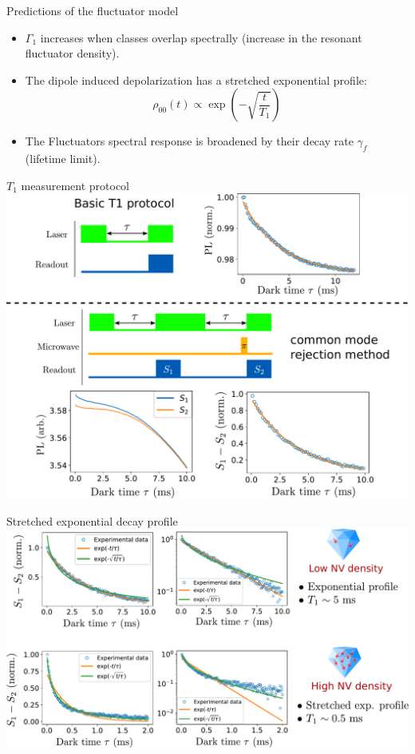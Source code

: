 \documentclass{beamer}
\begin{document}
\begin{frame}{Predictions of the fluctuator model}
\begin{itemize}
\item $\Gamma_1$ increases when classes overlap spectrally (increase in the resonant fluctuator density).
\item The dipole induced depolarization has a stretched exponential profile:
$$ \rho_{00}(t) \propto \exp(-\sqrt{\frac{t}{T_1}})$$
\item The Fluctuators spectral response is broadened by their decay rate $\gamma_f$ (lifetime limit).
\end{itemize}
\end{frame}

\begin{frame}{$T_1$ measurement protocol}
\centering
\includegraphics[width=\textwidth,height=0.9\textheight,keepaspectratio]{slide_T1_protocol}
\end{frame}

\begin{frame}{Stretched exponential decay profile}
\centering
\includegraphics[width=\textwidth,height=0.9\textheight,keepaspectratio]{Slide_T1_exp_stretch}
\end{frame}
\end{document}
